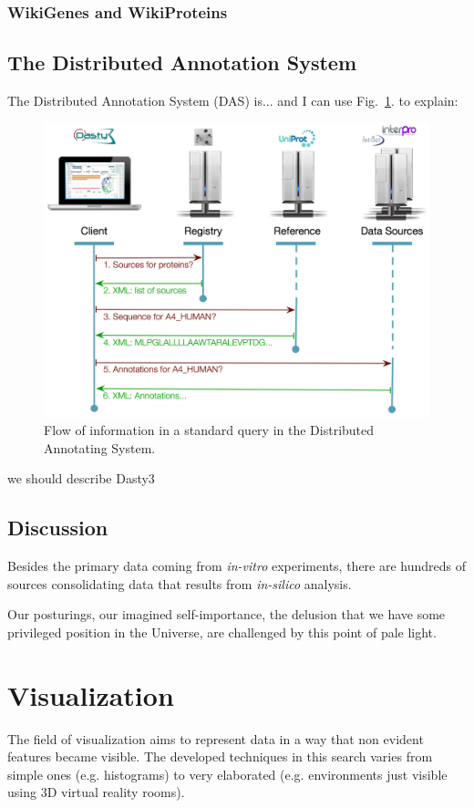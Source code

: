 \subsubsection{WikiGenes and WikiProteins}

\subsection{The Distributed Annotation System}
The Distributed Annotation System (DAS) is... \cite{JEN2008} and I can use Fig.~\ref{fig:das}. to explain:
\begin{figure}  
\centering
\includegraphics[width=\textwidth]{figures/DAS.png}
\caption[DAS Flow of Information.]{Flow of information in a standard query in the Distributed Annotating System.
\label{fig:das}}
\end{figure}
we should describe Dasty3 \cite{VIL2011}


\subsection{Discussion}
Besides the primary data coming from \emph{in-vitro} experiments, there are hundreds of sources consolidating data that results from \emph{in-silico} analysis.

\begin{savequote}[75mm] 
Our posturings, our imagined self-importance, the delusion that we have some privileged position in the Universe, are challenged by this point of pale light.
\end{savequote}
\section{Visualization}
The field of visualization aims to represent data in a way that non evident features became visible. The developed techniques in this search varies from simple ones (e.g. histograms) to very elaborated (e.g. environments just visible using 3D virtual reality rooms).

